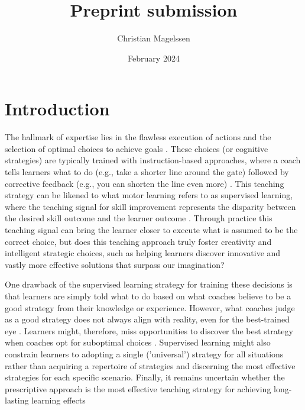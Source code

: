 \documentclass{article}
\title{Preprint submission}
\author{Christian Magelssen}
\date{February 2024}
\begin{document}
\maketitle

\section{Introduction}

The hallmark of expertise lies in the flawless execution of actions and the selection of optimal choices to achieve goals  \cite{wolpert_principles_2011, krakauer_motor_2019, mangalam_investigating_2023, du_relationship_2022, gallivan_decision-making_2018}. These choices (or cognitive strategies) are typically trained with instruction-based approaches, where a coach tells learners what to do (e.g., take a shorter line around the gate) followed by corrective feedback (e.g., you can shorten the line even more) \cite{williams_practice_2005, williams_effective_2023, hodges_role_1999}. This teaching strategy can be likened to what motor learning refers to as supervised learning, where the teaching signal for skill improvement represents the disparity between the desired skill outcome and the learner outcome \cite{jordan_forward_1992, wolpert_motor_2010, doya_complementary_2000}. Through practice this teaching signal can bring the learner closer to execute what is assumed to be the correct choice, but does this teaching approach truly foster creativity and intelligent strategic choices, such as helping learners discover innovative and vastly more effective solutions that surpass our imagination?

One drawback of the supervised learning strategy for training these decisions is that learners are simply told what to do based on what coaches believe to be a good strategy from their knowledge or experience. However, what coaches judge as a good strategy does not always align with reality, even for the best-trained eye \cite{supej_impact_2019, cochrum_visual_2021}. Learners might, therefore, miss opportunities to discover the best strategy when coaches opt for suboptimal choices \cite{gray_plateaus_2017}. Supervised learning might also constrain learners to adopting a single ('universal') strategy for all situations rather than acquiring a repertoire of strategies and discerning the most effective strategies for each specific scenario. Finally, it remains uncertain whether the prescriptive approach is the most effective teaching strategy for achieving long-lasting learning effects \cite{wulf_instructions_1997} 
\end{document}
